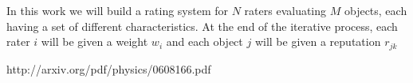 In this work we will build a rating system for $N$ raters evaluating $M$ objects, each having a set of different characteristics. At the end of the iterative process, each rater $i$ will be given a weight $w_i$ and each object $j$ will be given a reputation $r_{jk}$



http://arxiv.org/pdf/physics/0608166.pdf